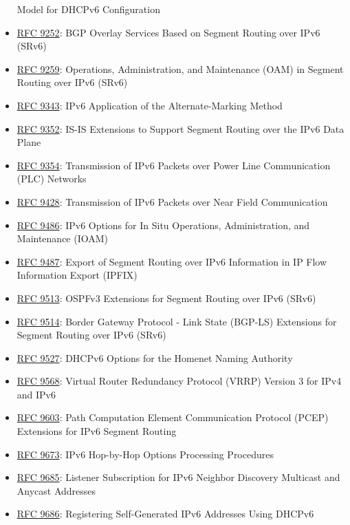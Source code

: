 \documentclass[
]{article}
\begin{document}
\begin{itemize}
  Model for DHCPv6 Configuration
\item
  \href{https://www.rfc-editor.org/info/rfc9252}{RFC 9252}: BGP Overlay
  Services Based on Segment Routing over IPv6 (SRv6)
\item
  \href{https://www.rfc-editor.org/info/rfc9259}{RFC 9259}: Operations,
  Administration, and Maintenance (OAM) in Segment Routing over IPv6
  (SRv6)
\item
  \href{https://www.rfc-editor.org/info/rfc9343}{RFC 9343}: IPv6
  Application of the Alternate-Marking Method
\item
  \href{https://www.rfc-editor.org/info/rfc9352}{RFC 9352}: IS-IS
  Extensions to Support Segment Routing over the IPv6 Data Plane
\item
  \href{https://www.rfc-editor.org/info/rfc9354}{RFC 9354}: Transmission
  of IPv6 Packets over Power Line Communication (PLC) Networks
\item
  \href{https://www.rfc-editor.org/info/rfc9428}{RFC 9428}: Transmission
  of IPv6 Packets over Near Field Communication
\item
  \href{https://www.rfc-editor.org/info/rfc9486}{RFC 9486}: IPv6 Options
  for In Situ Operations, Administration, and Maintenance (IOAM)
\item
  \href{https://www.rfc-editor.org/info/rfc9487}{RFC 9487}: Export of
  Segment Routing over IPv6 Information in IP Flow Information Export
  (IPFIX)
\item
  \href{https://www.rfc-editor.org/info/rfc9513}{RFC 9513}: OSPFv3
  Extensions for Segment Routing over IPv6 (SRv6)
\item
  \href{https://www.rfc-editor.org/info/rfc9514}{RFC 9514}: Border
  Gateway Protocol - Link State (BGP-LS) Extensions for Segment Routing
  over IPv6 (SRv6)
\item
  \href{https://www.rfc-editor.org/info/rfc9527}{RFC 9527}: DHCPv6
  Options for the Homenet Naming Authority
\item
  \href{https://www.rfc-editor.org/info/rfc9568}{RFC 9568}: Virtual
  Router Redundancy Protocol (VRRP) Version 3 for IPv4 and IPv6
\item
  \href{https://www.rfc-editor.org/info/rfc9603}{RFC 9603}: Path
  Computation Element Communication Protocol (PCEP) Extensions for IPv6
  Segment Routing
\item
  \href{https://www.rfc-editor.org/info/rfc9673}{RFC 9673}: IPv6
  Hop-by-Hop Options Processing Procedures
\item
  \href{https://www.rfc-editor.org/info/rfc9685}{RFC 9685}: Listener
  Subscription for IPv6 Neighbor Discovery Multicast and Anycast
  Addresses
\item
  \href{https://www.rfc-editor.org/info/rfc9686}{RFC 9686}: Registering
  Self-Generated IPv6 Addresses Using DHCPv6
\end{itemize}
\end{document}
